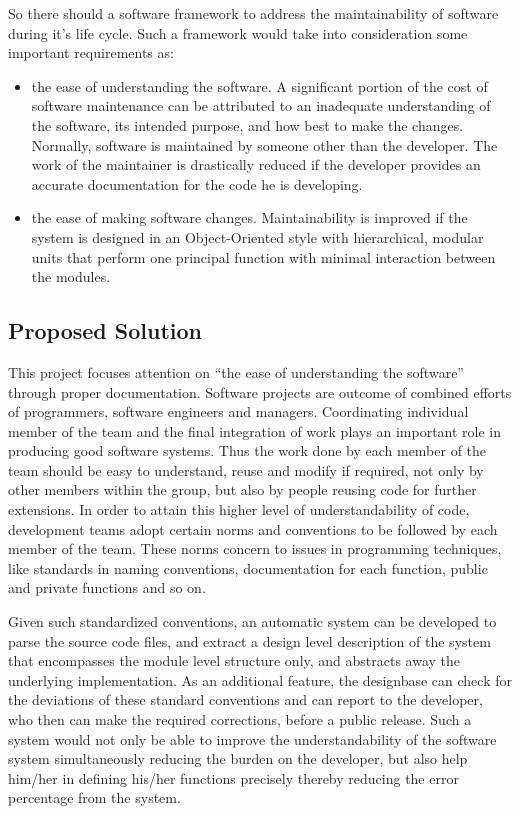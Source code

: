 So there should a software framework to address the maintainability
of software during it's life cycle.  Such a framework would take into
consideration some important requirements as:
\begin{itemize}
\item the ease of understanding the software.  A significant portion
  of the cost of software maintenance can be attributed to an inadequate
  understanding of the software, its intended purpose, and how best to
  make the changes.  Normally, software is maintained by someone other
  than the developer.  The work of the maintainer is drastically reduced
  if the developer provides an accurate documentation for the code he is
  developing.
\item the ease of making software changes.  Maintainability is
  improved if the system is designed in an Object-Oriented style with
  hierarchical, modular units that perform one principal function with
  minimal interaction between the modules.
\end{itemize}


\subsection{Proposed Solution}
This project focuses attention on ``the ease of understanding the
software'' through proper documentation. Software projects are outcome
of combined efforts of programmers, software engineers and managers.
Coordinating individual member of the team and the final integration
of work plays an important role in producing good software systems.
Thus the work done by each member of the team should be easy to
understand, reuse and modify if required, not only by other members
within the group, but also by people reusing code for further
extensions.  In order to attain this higher level of understandability
of code, development teams adopt certain norms and conventions to be
followed by each member of the team.  These norms concern to issues in
programming techniques, like standards in naming conventions,
documentation for each function, public and private functions and so
on.

Given such standardized conventions, an automatic system can be
developed to parse the source code files, and extract a design level
description of the system that encompasses the module level structure
only, and abstracts away the underlying implementation.  As an
additional feature, the designbase can check for the deviations of
these standard conventions and can report to the developer, who then
can make the required corrections, before a public release.  Such a
system would not only be able to improve the understandability of the
software system simultaneously reducing the burden on the developer,
but also help him/her in defining his/her functions precisely thereby
reducing the error percentage from the system.



